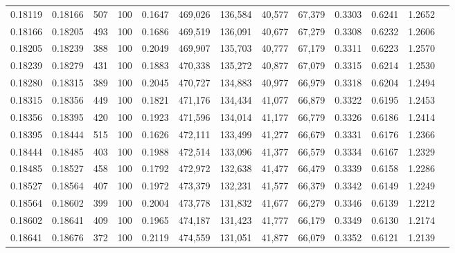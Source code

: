 \begin{tabular}{rrrrrrrrrrrrr}
0.18119 & 0.18166 &   507 & 100 &                                     0.1647 & 469,026 & 136,584 &  40,577 &  67,379 & 0.3303 & 0.6241 & 1.2652 \\
0.18166 & 0.18205 &   493 & 100 &                                     0.1686 & 469,519 & 136,091 &  40,677 &  67,279 & 0.3308 & 0.6232 & 1.2606 \\
0.18205 & 0.18239 &   388 & 100 &                                     0.2049 & 469,907 & 135,703 &  40,777 &  67,179 & 0.3311 & 0.6223 & 1.2570 \\
0.18239 & 0.18279 &   431 & 100 &                                     0.1883 & 470,338 & 135,272 &  40,877 &  67,079 & 0.3315 & 0.6214 & 1.2530 \\
0.18280 & 0.18315 &   389 & 100 &                                     0.2045 & 470,727 & 134,883 &  40,977 &  66,979 & 0.3318 & 0.6204 & 1.2494 \\
0.18315 & 0.18356 &   449 & 100 &                                     0.1821 & 471,176 & 134,434 &  41,077 &  66,879 & 0.3322 & 0.6195 & 1.2453 \\
0.18356 & 0.18395 &   420 & 100 &                                     0.1923 & 471,596 & 134,014 &  41,177 &  66,779 & 0.3326 & 0.6186 & 1.2414 \\
0.18395 & 0.18444 &   515 & 100 &                                     0.1626 & 472,111 & 133,499 &  41,277 &  66,679 & 0.3331 & 0.6176 & 1.2366 \\
0.18444 & 0.18485 &   403 & 100 &                                     0.1988 & 472,514 & 133,096 &  41,377 &  66,579 & 0.3334 & 0.6167 & 1.2329 \\
0.18485 & 0.18527 &   458 & 100 &                                     0.1792 & 472,972 & 132,638 &  41,477 &  66,479 & 0.3339 & 0.6158 & 1.2286 \\
0.18527 & 0.18564 &   407 & 100 &                                     0.1972 & 473,379 & 132,231 &  41,577 &  66,379 & 0.3342 & 0.6149 & 1.2249 \\
0.18564 & 0.18602 &   399 & 100 &                                     0.2004 & 473,778 & 131,832 &  41,677 &  66,279 & 0.3346 & 0.6139 & 1.2212 \\
0.18602 & 0.18641 &   409 & 100 &                                     0.1965 & 474,187 & 131,423 &  41,777 &  66,179 & 0.3349 & 0.6130 & 1.2174 \\
0.18641 & 0.18676 &   372 & 100 &                                     0.2119 & 474,559 & 131,051 &  41,877 &  66,079 & 0.3352 & 0.6121 & 1.2139 \\

\end{tabular}

